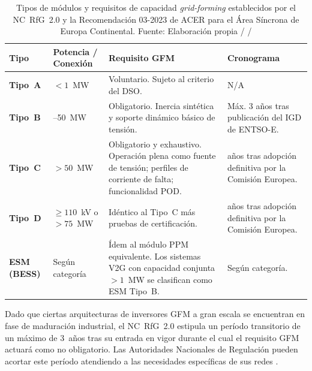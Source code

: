 \begin{table}[H]
    \centering
    \caption[Clasificación de módulos según el NC~RfG~2.0 y requisito
    GFM asociado.]{%
    Tipos de módulos y requisitos de capacidad \textit{grid-forming}
    establecidos por el NC~RfG~2.0 y la Recomendación 03-2023 de ACER
    para el Área Síncrona de Europa Continental. Fuente: Elaboración
    propia / \cite{entsoe2025phase2} / \cite{acer2023}}
    \vspace{0.3cm}
    \small
    \begin{tabularx}{\textwidth}{>{\bfseries}p{1.8cm}
                                 >{\RaggedRight\arraybackslash}p{3.2cm}
                                 >{\RaggedRight\arraybackslash}X
                                 >{\centering\arraybackslash}p{2.5cm}}
    \toprule
    \textbf{Tipo} & \textbf{Potencia / Conexión}
                  & \textbf{Requisito GFM}
                  & \textbf{Cronograma} \\
    \midrule
    Tipo~A
        & $< 1$~MW
        & Voluntario. Sujeto al criterio del DSO.
        & N/A \\
    \addlinespace
    Tipo~B
        & 1--50~MW
        & Obligatorio. Inercia sintética y soporte dinámico básico de
          tensión.
        & Máx. 3 años tras publicación del IGD de ENTSO-E. \\
    \addlinespace
    Tipo~C
        & $> 50$~MW
        & Obligatorio y exhaustivo. Operación plena como fuente de
          tensión; perfiles de corriente de falta; funcionalidad POD.
        & 3 años tras adopción definitiva por la Comisión Europea. \\
    \addlinespace
    Tipo~D
        & $\geq 110$~kV o $> 75$~MW
        & Idéntico al Tipo~C más pruebas de certificación.
        & 3 años tras adopción definitiva por la Comisión Europea. \\
    \addlinespace
    ESM (BESS)
        & Según categoría
        & Ídem al módulo PPM equivalente. Los sistemas V2G con
          capacidad conjunta $> 1$~MW se clasifican como ESM Tipo~B.
        & Según categoría. \\
    \bottomrule
    \end{tabularx}
    \label{tab:nc_rfg_clasificacion}
\end{table}

Dado que ciertas arquitecturas de inversores GFM a gran escala se
encuentran en fase de maduración industrial, el NC~RfG~2.0 estipula un
período transitorio de un máximo de 3~años tras su entrada en vigor
durante el cual el requisito GFM actuará como no obligatorio. Las
Autoridades Nacionales de Regulación pueden acortar este período
atendiendo a las necesidades específicas de sus redes
\cite{acer2023,entsoe2025phase2}.

